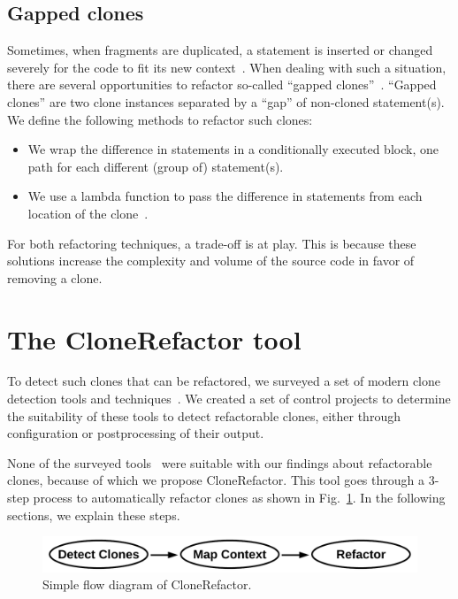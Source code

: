 \documentclass[]{IEEEtran}
\begin{document}
\subsection{Gapped clones} \label{sec:t3r}
Sometimes, when fragments are duplicated, a statement is inserted or changed severely for the code to fit its new context~\cite{roy2007survey}. When dealing with such a situation, there are several opportunities to refactor so-called ``gapped clones''~\cite{ueda2002detection, zhao2018automatic}. ``Gapped clones'' are two clone instances separated by a ``gap'' of non-cloned statement(s). We define the following methods to refactor such clones:
\begin{itemize}
  \item We wrap the difference in statements in a conditionally executed block, one path for each different (group of) statement(s).
  \item We use a lambda function to pass the difference in statements from each location of the clone~\cite{tsantalis2017clone}.
\end{itemize}
For both refactoring techniques, a trade-off is at play. This is because these solutions increase the complexity and volume of the source code in favor of removing a clone.

\section{The CloneRefactor tool}
To detect such clones that can be refactored, we surveyed a set of modern clone detection tools and techniques~\cite{svajlenko2014evaluating, sheneamer2016survey, gautam2016various, roy2009comparison}. We created a set of control projects to determine the suitability of these tools to detect refactorable clones, either through configuration or postprocessing of their output.

None of the surveyed tools~\cite{ragkhitwetsagul2019siamese, roy2008nicad, semura2017ccfindersw, sajnani2016sourcerercc, saini2018oreo, jiang2007deckard, kamalpriya2017enhancing, mazinanian2016jdeodorant} were suitable with our findings about refactorable clones, because of which we propose CloneRefactor. This tool goes through a 3-step process to automatically refactor clones as shown in Fig.~\ref{fig:clonerefactorflow}. In the following sections, we explain these steps.
\begin{figure}[H]
  \includegraphics[width=1\columnwidth]{img/flow}
  \caption{Simple flow diagram of CloneRefactor.}
  \label{fig:clonerefactorflow}
\end{figure}
\end{document}
